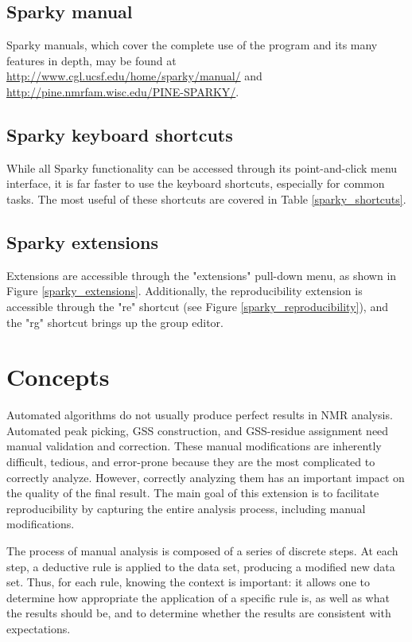 \subsection*{Sparky manual}
Sparky manuals, which cover the complete use of the program and its many
features in depth, may be found at 
\url{http://www.cgl.ucsf.edu/home/sparky/manual/} and 
\url{http://pine.nmrfam.wisc.edu/PINE-SPARKY/}.

\subsection*{Sparky keyboard shortcuts}
While all Sparky functionality can be accessed through its point-and-click
menu interface, it is far faster to use the keyboard shortcuts, especially
for common tasks.  The most useful of these shortcuts are covered in Table
\ref{sparky_shortcuts}.

\subsection*{Sparky extensions}
Extensions are accessible through the "extensions" pull-down menu,
as shown in Figure \ref{sparky_extensions}.
Additionally, the reproducibility extension is accessible through
the "re" shortcut (see Figure \ref{sparky_reproducibility}),
and the "rg" shortcut brings up the group editor.



\section{Concepts}
Automated algorithms do not usually produce perfect results in NMR analysis.
Automated peak picking,
GSS construction, and GSS-residue assignment need manual validation and
correction.  These manual modifications are inherently difficult, tedious,
and error-prone because they are the most complicated to correctly analyze.
However, correctly analyzing them has an important impact on the quality
of the final result.
The main goal of this extension is to facilitate reproducibility
by capturing the entire analysis process, including manual modifications.

The process of manual analysis is composed of a series of discrete steps.
At each step, a deductive rule is applied to the data set, producing a
modified new data set.  Thus, for each rule, knowing the context is important:
it allows one to determine how appropriate the application of a specific rule
is, as well as what the results should be, and to determine whether the 
results are consistent with expectations.

